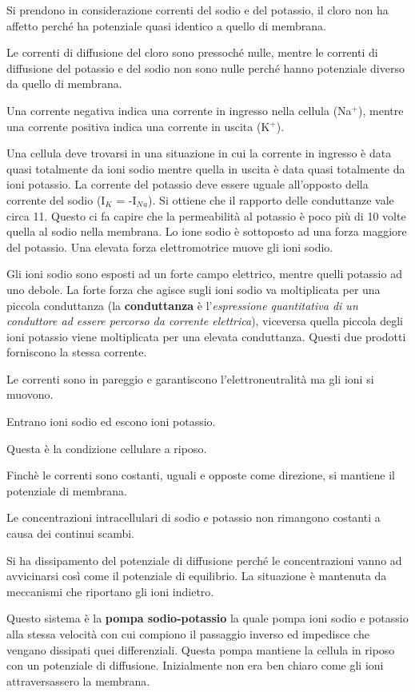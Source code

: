 \documentclass[]{article}
\begin{document}
Si prendono in considerazione correnti del sodio e del potassio, il
cloro non ha affetto perché ha potenziale quasi identico a quello di
membrana.

Le correnti di diffusione del cloro sono pressoché nulle, mentre le
correnti di diffusione del potassio e del sodio non sono nulle perché
hanno potenziale diverso da quello di membrana.

Una corrente negativa indica una corrente in ingresso nella cellula
(Na\(^+\)), mentre una corrente positiva indica una corrente in uscita
(K\(^+\)).

Una cellula deve trovarsi in una situazione in cui la corrente in
ingresso è data quasi totalmente da ioni sodio mentre quella in uscita è
data quasi totalmente da ioni potassio. La corrente del potassio deve
essere uguale all'opposto della corrente del sodio (I\(_K\) =
-I\(_N\)\(_a\)). Si ottiene che il rapporto delle conduttanze vale circa
11. Questo ci fa capire che la permeabilità al potassio è poco più di 10
volte quella al sodio nella membrana. Lo ione sodio è sottoposto ad una
forza maggiore del potassio. Una elevata forza elettromotrice muove gli
ioni sodio.

Gli ioni sodio sono esposti ad un forte campo elettrico, mentre quelli
potassio ad uno debole. La forte forza che agisce sugli ioni sodio va
moltiplicata per una piccola conduttanza (la \textbf{conduttanza} è
l'\emph{espressione quantitativa di un conduttore ad essere percorso da
corrente elettrica}), viceversa quella piccola degli ioni potassio viene
moltiplicata per una elevata conduttanza. Questi due prodotti forniscono
la stessa corrente.

Le correnti sono in pareggio e garantiscono l'elettroneutralità ma gli
ioni si muovono.

Entrano ioni sodio ed escono ioni potassio.

Questa è la condizione cellulare a riposo.

Finchè le correnti sono costanti, uguali e opposte come direzione, si
mantiene il potenziale di membrana.

Le concentrazioni intracellulari di sodio e potassio non rimangono
costanti a causa dei continui scambi.

Si ha dissipamento del potenziale di diffusione perché le concentrazioni
vanno ad avvicinarsi così come il potenziale di equilibrio. La
situazione è mantenuta da meccanismi che riportano gli ioni indietro.

Questo sistema è la \textbf{pompa sodio-potassio} la quale pompa ioni
sodio e potassio alla stessa velocità con cui compiono il passaggio
inverso ed impedisce che vengano dissipati quei differenziali. Questa
pompa mantiene la cellula in riposo con un potenziale di diffusione.
Inizialmente non era ben chiaro come gli ioni attraversassero la
membrana.
\end{document}
